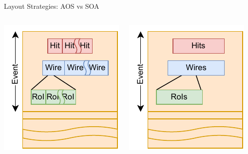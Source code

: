 \documentclass[aspectratio=169]{beamer}
\begin{document}
\begin{frame}{Layout Strategies: AOS vs SOA}
  \begin{columns}
    \centering
    \includegraphics[width=\textwidth]{Figures/AOSLayout.pdf}

    \centering
    \includegraphics[width=\textwidth]{Figures/SOALayout.pdf}
  \end{columns}
\end{frame}
\end{document}
